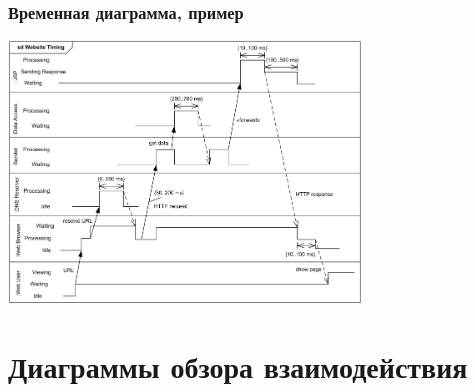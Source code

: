 \documentclass{../mcsslides}
\begin{document}
    \begin{frame}
        \frametitle{Временная диаграмма, пример}
        \begin{center}
            \includegraphics[width=0.7\textwidth]{timingDiagramExample.png}
        \end{center}
    \end{frame}

    \section{Диаграммы обзора взаимодействия}
\end{document}
